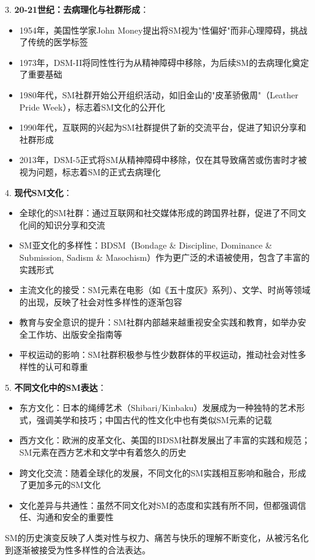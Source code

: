 \documentclass[12pt,UTF8]{ctexbook}
\begin{document}
3. \textbf{20-21世纪：去病理化与社群形成}：
  \begin{itemize}
  \item 1954年，美国性学家John Money提出将SM视为"性偏好"而非心理障碍，挑战了传统的医学标签
  \item 1973年，DSM-II将同性性行为从精神障碍中移除，为后续SM的去病理化奠定了重要基础
  \item 1980年代，SM社群开始公开组织活动，如旧金山的"皮革骄傲周"（Leather Pride Week），标志着SM文化的公开化
  \item 1990年代，互联网的兴起为SM社群提供了新的交流平台，促进了知识分享和社群形成
  \item 2013年，DSM-5正式将SM从精神障碍中移除，仅在其导致痛苦或伤害时才被视为问题，标志着SM的正式去病理化
  \end{itemize}

4. \textbf{现代SM文化}：
  \begin{itemize}
  \item 全球化的SM社群：通过互联网和社交媒体形成的跨国界社群，促进了不同文化间的知识分享和交流
  \item SM亚文化的多样性：BDSM（Bondage \& Discipline, Dominance \& Submission, Sadism \& Masochism）作为更广泛的术语被使用，包含了丰富的实践形式
  \item 主流文化的接受：SM元素在电影（如《五十度灰》系列）、文学、时尚等领域的出现，反映了社会对性多样性的逐渐包容
  \item 教育与安全意识的提升：SM社群内部越来越重视安全实践和教育，如举办安全工作坊、出版安全指南等
  \item 平权运动的影响：SM社群积极参与性少数群体的平权运动，推动社会对性多样性的认可和尊重
  \end{itemize}

5. \textbf{不同文化中的SM表达}：
  \begin{itemize}
  \item 东方文化：日本的绳缚艺术（Shibari/Kinbaku）发展成为一种独特的艺术形式，强调美学和技巧；中国古代的性文化中也有类似SM元素的记载
  \item 西方文化：欧洲的皮革文化、美国的BDSM社群发展出了丰富的实践和规范；SM元素在西方艺术和文学中有着悠久的历史
  \item 跨文化交流：随着全球化的发展，不同文化的SM实践相互影响和融合，形成了更加多元的SM文化
  \item 文化差异与共通性：虽然不同文化对SM的态度和实践有所不同，但都强调信任、沟通和安全的重要性
  \end{itemize}

SM的历史演变反映了人类对性与权力、痛苦与快乐的理解不断变化，从被污名化到逐渐被接受为性多样性的合法表达。
\end{document}
